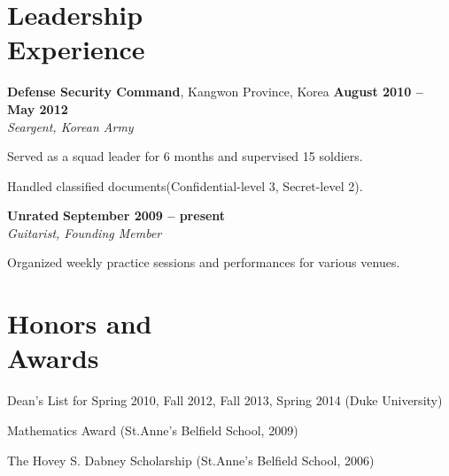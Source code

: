 \documentclass[11pt,margin,line]{cv}
\begin{document}
\begin{resume}
    \section{\mysidestyle Leadership\\Experience}
    \textbf{Defense Security Command}, Kangwon Province, Korea \hfill \textbf{August 2010 -- May 2012}\vspace{1mm}\\\vspace{0mm}%
    \textsl{Seargent, Korean Army}
    \vspace{-2mm}\\\vspace{-1mm}%
    \begin{list3}
        \item Served as a squad leader for 6 months and supervised 15 soldiers.
        \item Handled classified documents(Confidential-level 3, Secret-level 2).
    \end{list3}
    \textbf{Unrated}  \hfill \textbf{September 2009 -- present}\vspace{1mm}\\\vspace{0mm}%
    \textsl{Guitarist, Founding Member}
    \vspace{-2mm}\\\vspace{-1mm}%
    \begin{list3}
        \item Organized weekly practice sessions and performances for various venues.
    \end{list3}
    \section{\mysidestyle Honors and\\Awards}
    \begin{list3}
        \item Dean's List for Spring 2010, Fall 2012, Fall 2013, Spring 2014 (Duke University)
        \item Mathematics Award (St.Anne's Belfield School, 2009)
        \item The Hovey S. Dabney Scholarship (St.Anne's Belfield School, 2006)
    \end{list3}

\end{resume}
\end{document}
